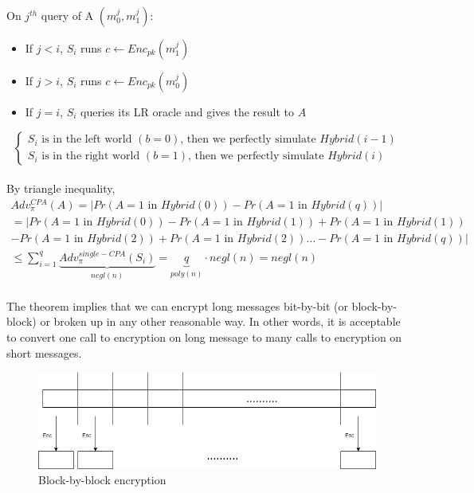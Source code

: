 \documentclass{scribe}
\begin{document}
On $j^{th}$ query of A $(m_0^j,m_1^j)$:
\begin{itemize}
    \item If $j<i$, $S_i$ runs $c \leftarrow Enc_{pk}(m_1^j)$
    \item If $j>i$, $S_i$ runs $c \leftarrow Enc_{pk}(m_0^j)$
    \item If $j=i$, $S_i$ queries its LR oracle and gives the result to $A$
\end{itemize}
\begin{equation}
\begin{cases}
    S_i\text{ is in the left world }(b=0)\text{, then we perfectly simulate }Hybrid(i-1) \\
    S_i\text{ is in the right world }(b=1)\text{, then we perfectly simulate }Hybrid(i)
\end{cases}
\end{equation}
\\
By triangle inequality,
\begin{multline*}
Adv_{\pi}^{CPA}(A) = \big|Pr(A=1\text{ in } Hybrid(0)) - Pr(A=1\text{ in } Hybrid(q)) \big|\\
= \big|Pr(A=1\text{ in } Hybrid(0)) - Pr(A=1\text{ in } Hybrid(1)) + Pr(A=1\text{ in } Hybrid(1)) \\
-Pr(A=1\text{ in } Hybrid(2)) + Pr(A=1\text{ in } Hybrid(2)) \dots -Pr(A=1\text{ in } Hybrid(q)) \big|\\
\le \sum_{i=1}^{q} \underbrace{Adv_{\pi}^{single-CPA}(S_i)}_{negl(n)} = \underbrace{q}_{poly(n)} \cdot negl(n) = negl(n)
\end{multline*}
\\
The theorem implies that we can encrypt long messages bit-by-bit (or block-by-block) or broken up in any other reasonable way. In other words, it is acceptable to convert one call to encryption on long message to many calls to encryption on short messages.
\\
\begin{figure}[H]
    \centering
    \includegraphics[scale=0.2]{second.jpg}
    \caption{Block-by-block encryption}
\end{figure}
\end{document}
